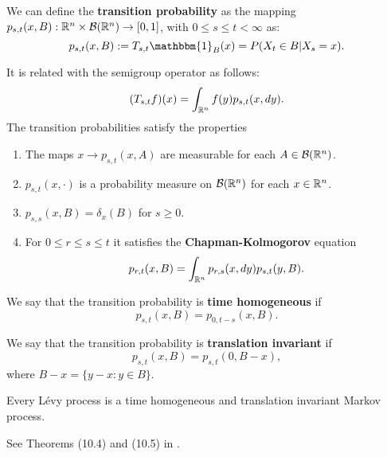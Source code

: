 \begin{Definition}\label{trans_prob}
We can define the \textbf{transition probability} as the mapping $p_{s,t}(x,B) : \mathbb{R}^n \times \mathcal{B}(\mathbb{R}^n) \to [0,1]$, 
with $0\leq s \leq t < \infty$ as: 
\begin{equation}
 p_{s,t}(x,B) := T_{s,t} \mathbbm{1}_B(x) = P(X_t \in B | X_s=x).
\end{equation}
\end{Definition}
It is related with the semigroup operator as follows:
\begin{equation}\label{evolution}
 (T_{s,t}f)(x) = \int_{\mathbb{R}^n} f(y) p_{s,t}(x,dy). 
\end{equation}
The transition probabilities satisfy the properties
 \begin{enumerate}
  \item The maps $x \to p_{s,t}(x,A)$ are measurable for each $A\in \mathcal{B}(\mathbb{R}^n)$.
  \item $p_{s,t}(x,\cdot)$ is a probability measure on $\mathcal{B}(\mathbb{R}^n)$ for each $x \in \mathbb{R}^n$.
  \item $p_{s,s}(x,B) = \delta_x(B)$ for $s \geq 0$. 
  \item For $0\leq r \leq s \leq t$ it satisfies the \textbf{Chapman-Kolmogorov} equation
  \begin{equation}
   p_{r,t}(x,B) = \int_{\mathbb{R}^n} p_{r,s}(x,dy) p_{s,t}(y,B). 
  \end{equation}  
 \end{enumerate}

\begin{Definition}\label{time-homogeneous}
We say that the transition probability is \textbf{time homogeneous} if 
\begin{equation}
 p_{s,t}(x,B) = p_{0,t-s}(x,B).
\end{equation}
\end{Definition}
\begin{Definition}
We say that the transition probability is \textbf{translation invariant} if 
\begin{equation}
 p_{s,t}(x,B) = p_{s,t}(0,B-x),
\end{equation}
where $B-x = \{y-x : y\in B \}$.
\end{Definition}

\begin{Theorem}
Every Lévy process is a time homogeneous and translation invariant Markov process.
\end{Theorem}
See Theorems (10.4) and (10.5) in \cite{Sato}.\\

